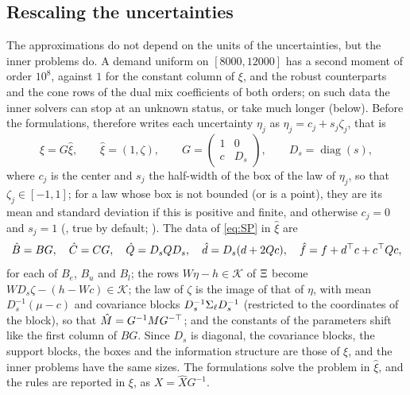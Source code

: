 \subsection{Rescaling the uncertainties}
\label{sec:rescaling}

The approximations do not depend on the units of the uncertainties, but the inner problems do.
A demand uniform on $[8000, 12000]$ has a second moment of order $10^8$, against $1$ for the constant column of $\xi$,
and the robust counterparts and the cone rows of the dual mix coefficients of both orders;
on such data the inner solvers can stop at an unknown status, or take much longer (below).
Before the formulations,  therefore writes each uncertainty $\eta_j$ as $\eta_j = c_j + s_j\zeta_j$, that is
\[
\xi = G\hat\xi,
\qquad
\hat\xi = (1, \zeta),
\qquad
G = \begin{pmatrix} 1 & 0 \\ c & D_s \end{pmatrix},
\qquad
D_s = \operatorname{diag}(s),
\]
where $c_j$ is the center and $s_j$ the half-width of the box of the law of $\eta_j$, so that $\zeta_j \in [-1, 1]$;
for a law whose box is not bounded (or is a point), they are its mean and standard deviation if this is positive and finite,
and otherwise $c_j = 0$ and $s_j = 1$
(, true by default; ).
The data of \eqref{eq:SP} in $\hat\xi$ are
\[
\hat B = BG, \quad
\hat C = CG, \quad
\hat Q = D_sQD_s, \quad
\hat d = D_s(d + 2Qc), \quad
\hat f = f + d^\top c + c^\top Q c,
\]
for each of $B_e$, $B_u$ and $B_l$;
the rows $W\eta - h \in \mathcal{K}$ of $\Xi$ become $WD_s\zeta - (h - Wc) \in \mathcal{K}$;
the law of $\zeta$ is the image of that of $\eta$, with mean $D_s^{-1}(\mu - c)$ and covariance blocks $D_s^{-1}\Sigma_{\ell}D_s^{-1}$ (restricted to the coordinates of the block), so that $\hat{M} = G^{-1}M G^{-\top}$;
and the constants of the parameters shift like the first column of $BG$.
Since $D_s$ is diagonal, the covariance blocks, the support blocks, the boxes and the information structure are those of $\xi$,
and the inner problems have the same sizes.
The formulations solve the problem in $\hat\xi$, and the rules are reported in $\xi$, as $X = \hat XG^{-1}$.

